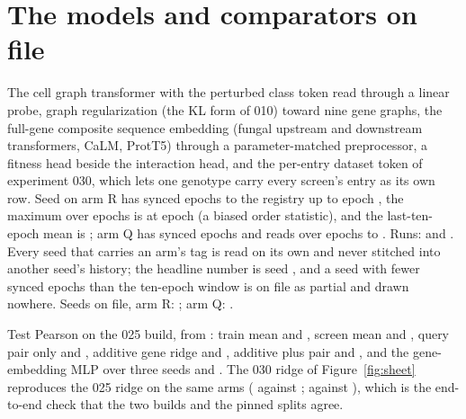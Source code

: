 
\clearpage
\section{The models and comparators on file}
\label{sec:models}

 The cell graph transformer with the perturbed class token read
through a linear probe, graph regularization (the KL form of 010) toward nine gene graphs,
the full-gene composite sequence embedding (fungal upstream and downstream transformers,
CaLM, ProtT5) through a parameter-matched preprocessor, a fitness head beside the
interaction head, and the per-entry dataset token of experiment 030, which lets one
genotype carry every screen's entry as its own row. Seed \gcgtRSeed{} on arm R has
synced \gcgtREpochsSynced{} epochs to the registry up to epoch \gcgtRLastEpoch{}, the
maximum over epochs is \gcgtRValMax{} at epoch \gcgtRValMaxEpoch{} (a biased order
statistic), and the last-ten-epoch mean is \gcgtRValWindow{}; arm Q has synced
\gcgtQEpochsSynced{} epochs and reads \gcgtQValWindow{} over epochs \gcgtQFirstEpoch{} to
\gcgtQLastEpoch{}. Runs: \texttt{\gcgtRRuns{}} and \texttt{\gcgtQRuns{}}. Every
seed that carries an arm's tag is read on its own and never stitched into another seed's
history; the headline number is seed \gcgtRSeed{}, and a seed with fewer synced epochs
than the ten-epoch window is on file as partial and drawn nowhere. Seeds on file, arm R:
\gcgtRSeedsLogged{}; arm Q: \gcgtQSeedsLogged{}.

 Test Pearson on the 025 build, from
: train mean \gbRBZerotrainmean{} and \gbQBZerotrainmean{},
screen mean \gbRBThreehierarchicalmean{} and \gbQBThreehierarchicalmean{}, query pair
only \gbRBFourquerypaironly{} and \gbQBFourquerypaironly{}, additive gene ridge
\gbRBOneadditivegene{} and \gbQBOneadditivegene{}, additive plus pair
\gbRBTwoadditivepluspair{} and \gbQBTwoadditivepluspair{}, and the gene-embedding MLP
over three seeds \gbRBFivegeneembeddingmlp{} and \gbQBFivegeneembeddingmlp{}. The 030
ridge of Figure~\ref{fig:sheet} reproduces the 025 ridge on the same arms
(\gloRBOneadditivegenetest{} against \gbRBOneadditivegene{}; \gloQBOneadditivegenetest{}
against \gbQBOneadditivegene{}), which is the end-to-end check that the two builds and
the pinned splits agree.

